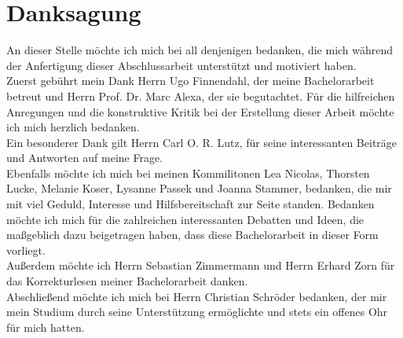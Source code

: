\chapter*{Danksagung}

 An dieser Stelle möchte ich mich bei all denjenigen bedanken, die mich während der Anfertigung dieser Abschlussarbeit unterstützt und motiviert haben.\\

Zuerst gebührt mein Dank Herrn Ugo Finnendahl, der meine Bachelorarbeit betreut und Herrn Prof. Dr. Marc Alexa, der sie begutachtet. Für die hilfreichen Anregungen und die konstruktive Kritik bei der Erstellung dieser Arbeit möchte ich mich herzlich bedanken.\\

Ein besonderer Dank gilt Herrn Carl O. R. Lutz,  für seine interessanten Beiträge und Antworten auf meine Frage.\\

Ebenfalls möchte ich mich bei meinen Kommilitonen Lea Nicolas, Thorsten Lucke, Melanie Koser, Lysanne Passek und Joanna Stammer,  bedanken, die mir mit viel Geduld, Interesse und Hilfsbereitschaft zur Seite standen. Bedanken möchte ich mich für die zahlreichen interessanten Debatten und Ideen, die maßgeblich dazu beigetragen haben, dass diese Bachelorarbeit in dieser Form vorliegt.\\

Außerdem möchte ich Herrn Sebastian Zimmermann und Herrn Erhard Zorn für das Korrekturlesen  meiner Bachelorarbeit danken.\\

Abschließend möchte ich mich bei Herrn Christian Schröder bedanken,  der mir mein Studium durch seine Unterstützung ermöglichte und stets ein offenes Ohr für mich hatten.



